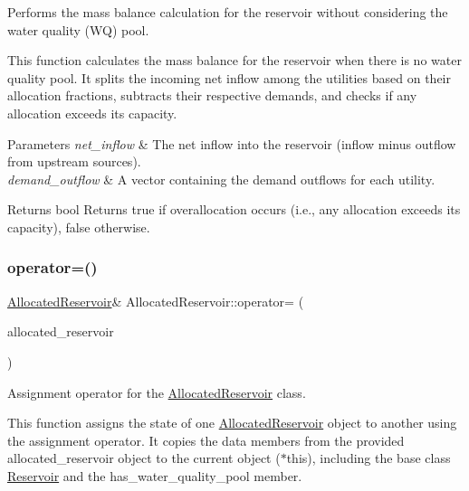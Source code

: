 Performs the mass balance calculation for the reservoir without considering the water quality (WQ) pool. 

This function calculates the mass balance for the reservoir when there is no water quality pool. It splits the incoming net inflow among the utilities based on their allocation fractions, subtracts their respective demands, and checks if any allocation exceeds its capacity.


\begin{DoxyParams}{Parameters}
{\em net\+\_\+inflow} & The net inflow into the reservoir (inflow minus outflow from upstream sources). \\
\hline
{\em demand\+\_\+outflow} & A vector containing the demand outflows for each utility.\\
\hline
\end{DoxyParams}
\begin{DoxyReturn}{Returns}
bool Returns {\ttfamily true} if overallocation occurs (i.\+e., any allocation exceeds its capacity), {\ttfamily false} otherwise. 
\end{DoxyReturn}
\mbox{\label{classAllocatedReservoir_a31c1733dbf7385599f1b9866df353b4c}} 
\subsubsection{\texorpdfstring{operator=()}{operator=()}}
{\footnotesize\ttfamily \mbox{\hyperlink{classAllocatedReservoir}{Allocated\+Reservoir}}\& Allocated\+Reservoir\+::operator= (\begin{DoxyParamCaption}\item[{const \mbox{\hyperlink{classAllocatedReservoir}{Allocated\+Reservoir}} \&}]{allocated\+\_\+reservoir }\end{DoxyParamCaption})}



Assignment operator for the \mbox{\hyperlink{classAllocatedReservoir}{Allocated\+Reservoir}} class. 

This function assigns the state of one {\ttfamily \mbox{\hyperlink{classAllocatedReservoir}{Allocated\+Reservoir}}} object to another using the assignment operator. It copies the data members from the provided {\ttfamily allocated\+\_\+reservoir} object to the current object ({\ttfamily $\ast$this}), including the base class {\ttfamily \mbox{\hyperlink{classReservoir}{Reservoir}}} and the {\ttfamily has\+\_\+water\+\_\+quality\+\_\+pool} member.


